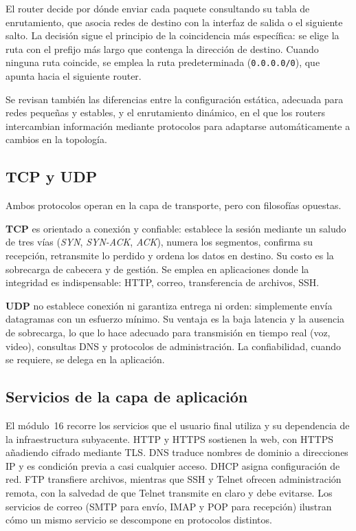 \documentclass[11pt,a4paper]{article}
\begin{document}
El router decide por dónde enviar cada paquete consultando su tabla de
enrutamiento, que asocia redes de destino con la interfaz de salida o el
siguiente salto. La decisión sigue el principio de la coincidencia más
específica: se elige la ruta con el prefijo más largo que contenga la
dirección de destino. Cuando ninguna ruta coincide, se emplea la ruta
predeterminada (\texttt{0.0.0.0/0}), que apunta hacia el siguiente router.

Se revisan también las diferencias entre la configuración estática, adecuada
para redes pequeñas y estables, y el enrutamiento dinámico, en el que los
routers intercambian información mediante protocolos para adaptarse
automáticamente a cambios en la topología.

\subsection{TCP y UDP}

Ambos protocolos operan en la capa de transporte, pero con filosofías opuestas.

\textbf{TCP} es orientado a conexión y confiable: establece la sesión mediante
un saludo de tres vías (\textit{SYN}, \textit{SYN-ACK}, \textit{ACK}),
numera los segmentos, confirma su recepción, retransmite lo perdido y ordena
los datos en destino. Su costo es la sobrecarga de cabecera y de gestión. Se
emplea en aplicaciones donde la integridad es indispensable: HTTP, correo,
transferencia de archivos, SSH.

\textbf{UDP} no establece conexión ni garantiza entrega ni orden: simplemente
envía datagramas con un esfuerzo mínimo. Su ventaja es la baja latencia y la
ausencia de sobrecarga, lo que lo hace adecuado para transmisión en tiempo
real (voz, video), consultas DNS y protocolos de administración. La
confiabilidad, cuando se requiere, se delega en la aplicación.

\subsection{Servicios de la capa de aplicación}

El módulo~16 recorre los servicios que el usuario final utiliza y su
dependencia de la infraestructura subyacente. HTTP y HTTPS sostienen la web,
con HTTPS añadiendo cifrado mediante TLS. DNS traduce nombres de dominio a
direcciones IP y es condición previa a casi cualquier acceso. DHCP asigna
configuración de red. FTP transfiere archivos, mientras que SSH y Telnet
ofrecen administración remota, con la salvedad de que Telnet transmite en
claro y debe evitarse. Los servicios de correo (SMTP para envío, IMAP y POP
para recepción) ilustran cómo un mismo servicio se descompone en protocolos
distintos.
\end{document}
